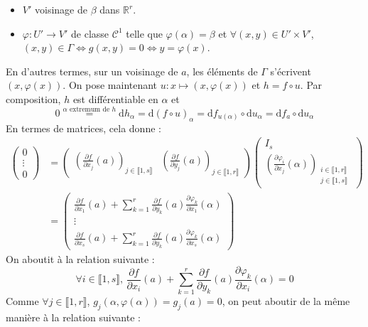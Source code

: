 \begin{demonstration}
\begin{itemize}
			\item $V'$ voisinage de $\beta$ dans $\mathbb{R}^r$.
			\item $\varphi : U' \rightarrow V'$ de classe $\mathcal{C}^1$ telle que $\varphi(\alpha) = \beta$ et $\forall (x, y) \in U' \times V'$, $(x, y) \in \Gamma \iff g(x, y) = 0 \iff y = \varphi(x)$.
		\end{itemize}
		En d'autres termes, sur un voisinage de $a$, les éléments de $\Gamma$ s'écrivent $(x, \varphi(x))$. On pose maintenant $u : x \mapsto (x, \varphi(x))$ et $h = f \circ u$. Par composition, $h$ est différentiable en $\alpha$ et
		\[ 0 \overset{\alpha \text{ extremum de } h}{=} \mathrm{d}h_\alpha = \mathrm{d}(f \circ u)_\alpha = \mathrm{d}f_{u(\alpha)} \circ \mathrm{d}u_\alpha = \mathrm{d}f_a \circ \mathrm{d}u_\alpha \]
		En termes de matrices, cela donne :
		\begin{align*}
			\begin{pmatrix} 0 \\ \vdots \\ 0 \end{pmatrix} &= \begin{pmatrix} \left( \frac{\partial f}{\partial x_j}(a) \right)_{j \in \llbracket 1, s \rrbracket} & \left( \frac{\partial f}{\partial y_j}(a) \right)_{j \in \llbracket 1, r \rrbracket} \end{pmatrix} \begin{pmatrix} I_s \\ \left( \frac{\partial \varphi_i}{\partial x_j}(\alpha) \right)_{\substack{i \in \llbracket 1, r \rrbracket \\ j \in \llbracket 1, s \rrbracket}} \end{pmatrix} \\
			&= \begin{pmatrix} \frac{\partial f}{\partial x_1}(a) + \sum_{k=1}^r \frac{\partial f}{\partial y_k}(a) \frac{\partial \varphi_k}{\partial x_1}(\alpha) \\ \vdots \\ \frac{\partial f}{\partial x_s}(a) + \sum_{k=1}^r \frac{\partial f}{\partial y_k}(a) \frac{\partial \varphi_k}{\partial x_s}(\alpha) \end{pmatrix}
		\end{align*}
		On aboutit à la relation suivante :
		\[ \forall i \in \llbracket 1, s \rrbracket, \, \frac{\partial f}{\partial x_i}(a) + \sum_{k=1}^r \frac{\partial f}{\partial y_k}(a) \frac{\partial \varphi_k}{\partial x_i}(\alpha) = 0 \tag{$**$} \]
		Comme $\forall j \in \llbracket 1, r \rrbracket$, $g_j(\alpha, \varphi(\alpha)) = g_j(a) = 0$, on peut aboutir de la même manière à la relation suivante :

\end{demonstration}
